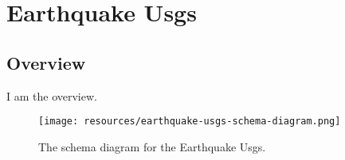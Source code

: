 
\section{Earthquake Usgs}
\label{sec:earthquake-usgs}
\subsection{Overview}
\label{ssec:overview}

I am the overview.

\begin{figure}[h!]
  \begin{center}
    \texttt{[image: resources/earthquake-usgs-schema-diagram.png]}
  \end{center}
  \caption{The schema diagram for the Earthquake Usgs.}
  \label{fig:ov-diagram}
\end{figure}


